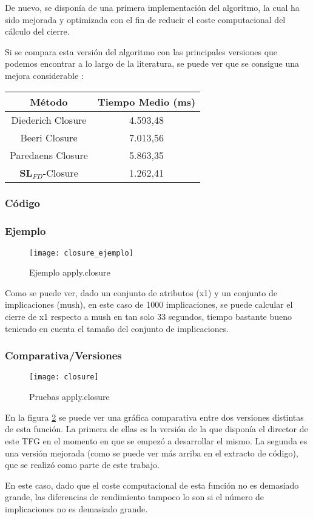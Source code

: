 De nuevo, se dispon\'ia de una primera implementaci\'on del algoritmo, la cual ha sido mejorada y optimizada con el fin de reducir el coste computacional del c\'alculo del cierre.

Si se compara esta versi\'on del algoritmo con las principales versiones que podemos encontrar a lo largo de la literatura, se puede ver que se consigue una mejora considerable \cite{Mora2012a}:

\begin{center}
    \begin{tabular}{c c}
        \hline
        M\'etodo & Tiempo Medio (ms) \\
        \hline
        Diederich Closure & 4.593,48 \\   
        Beeri Closure & 7.013,56 \\   
        Paredaens Closure & 5.863,35 \\  
        \(\textbf{SL}_{FD}\)-Closure & 1.262,41 \\  
    \end{tabular}
\end{center}
\newpage
\subsubsection{C\'odigo} 

\subsubsection{Ejemplo} 
\begin{figure}[h]
    \centering
    \texttt{[image: closure\_ejemplo]}
    \caption{Ejemplo apply.closure}
    \label{fig:closure_ejemplo}
\end{figure} 

Como se puede ver, dado un conjunto de atributos (x1) y un conjunto de implicaciones (mush), en este caso de 1000 implicaciones, se puede calcular el cierre de x1 respecto a mush en tan solo 33 segundos, tiempo bastante bueno teniendo en cuenta el tama\~no del conjunto de implicaciones.
\subsubsection{Comparativa/Versiones} 

\begin{figure}[H]
    \centering
    \texttt{[image: closure]}
    \caption{Pruebas apply.closure}
    \label{fig:closure}
\end{figure} 

En la figura \ref{fig:closure} se puede ver una gr\'afica comparativa entre dos versiones distintas de esta funci\'on. La primera de ellas es la versi\'on de la que dispon\'ia el director de este TFG en el momento en que se empez\'o a desarrollar el mismo. La segunda es una versi\'on mejorada (como se puede ver m\'as arriba en el extracto de c\'odigo), que se realiz\'o como parte de este trabajo.

En este caso, dado que el coste computacional de esta funci\'on no es demasiado grande, las diferencias de rendimiento tampoco lo son si el n\'umero de implicaciones no es demasiado grande.

